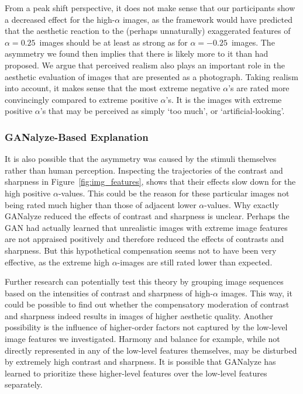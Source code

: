 \documentclass[../main.tex]{subfiles}
\begin{document}
From a peak shift perspective, it does not make sense that our participants show a decreased effect for the high-$\alpha$ images, as the framework would have predicted that the aesthetic reaction to the (perhaps unnaturally) exaggerated features of $\alpha=0.25$~images should be at least as strong as for $\alpha=-0.25$~images. The asymmetry we found then implies that there is likely more to it than \textcite{ramachandran1999science} had proposed. We argue that perceived realism also plays an important role in the aesthetic evaluation of images that are presented as a photograph. Taking realism into account, it makes sense that the most extreme negative $\alpha$'s are rated more convincingly compared to extreme positive $\alpha$'s. It is the images with extreme positive $\alpha$'s that may be perceived as simply `too much', or `artificial-looking'.

\subsubsection{GANalyze-Based Explanation}
It is also possible that the asymmetry was caused by the stimuli themselves rather than human perception. Inspecting the trajectories of the contrast and sharpness in Figure~\ref{fig:img_features}, shows that their effects slow down for the high positive $\alpha$-values. This could be the reason for these particular images not being rated much higher than those of adjacent lower $\alpha$-values. Why exactly GANalyze reduced the effects of contrast and sharpness is unclear. Perhaps the GAN had actually learned that unrealistic images with extreme image features are not appraised positively and therefore reduced the effects of contrasts and sharpness. But this hypothetical compensation seems not to have been very effective, as the extreme high $\alpha$-images are still rated lower than expected.

Further research can potentially test this theory by grouping image sequences based on the intensities of contrast and sharpness of high-$\alpha$ images. This way, it could be possible to find out whether the compensatory moderation of contrast and sharpness indeed results in images of higher aesthetic quality. Another possibility is the influence of higher-order factors not captured by the low-level image features we investigated. Harmony and balance for example, while not directly represented in any of the low-level features themselves, may be disturbed by extremely high contrast and sharpness. It is possible that GANalyze has learned to prioritize these higher-level features over the low-level features separately.
\end{document}
